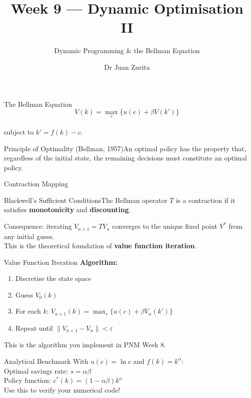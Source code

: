 \documentclass[aspectratio=169, 10pt]{beamer}
\title{Week 9 --- Dynamic Optimisation II}
\subtitle{Dynamic Programming \& the Bellman Equation}
\author{Dr Juan Zurita}
\institute{Optimisation \& Mathematical Methods for Economics\\
The University of Edinburgh~$\cdot$~School of Economics}
\date{}
\begin{document}
\maketitle

\begin{frame}{The Bellman Equation}
$$V(k) = \max_c\{u(c) + \beta V(k')\}$$\\\bigskip subject to $k' = f(k) - c$.\\\bigskip\begin{block}{Principle of Optimality (Bellman, 1957)}An optimal policy has the property that, regardless of the initial state, the remaining decisions must constitute an optimal policy.\end{block}
\end{frame}

\begin{frame}{Contraction Mapping}
\begin{block}{Blackwell's Sufficient Conditions}The Bellman operator $T$ is a contraction if it satisfies \textbf{monotonicity} and \textbf{discounting}.\end{block}\par\bigskip Consequence: iterating $V_{n+1} = TV_n$ converges to the unique fixed point $V^*$ from any initial guess.\\\bigskip This is the theoretical foundation of \textbf{value function iteration}.
\end{frame}

\begin{frame}{Value Function Iteration}
\textbf{Algorithm:}\begin{enumerate}\item Discretise the state space\item Guess $V_0(k)$\item For each $k$: $V_{n+1}(k) = \max_c\{u(c) + \beta V_n(k')\}$\item Repeat until $\|V_{n+1} - V_n\| < \varepsilon$\end{enumerate}\par\bigskip This is the algorithm you implement in PNM Week 8.
\end{frame}

\begin{frame}{Analytical Benchmark}
With $u(c) = \ln c$ and $f(k) = k^\alpha$:\\\bigskip Optimal savings rate: $s = \alpha\beta$\\\bigskip Policy function: $c^*(k) = (1-\alpha\beta)k^\alpha$\\\bigskip Use this to verify your numerical code!
\end{frame}
\end{document}
